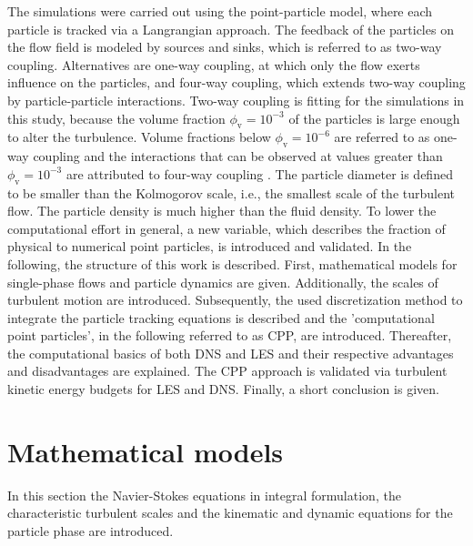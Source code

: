 \documentclass[11pt,a4paper,openany,oneside,parskip=half*]{article}
\begin{document}
\newline
The simulations were carried out using the point-particle model, where each particle is tracked via a Langrangian approach. The feedback of the particles on the flow field is modeled by sources and sinks, which is referred to as two-way coupling. Alternatives are one-way coupling, at which only the flow exerts influence on the particles, and four-way coupling, which extends two-way coupling by particle-particle interactions. Two-way coupling is fitting for the simulations in this study, because the volume fraction $\phi_\mathrm{v}= 10^{-3}$ of the particles is large enough to alter the turbulence. Volume fractions below $\phi_\mathrm{v}= 10^{-6}$ are referred to as one-way coupling and the interactions that can be observed at values greater than $\phi_\mathrm{v}= 10^{-3}$ are attributed to four-way coupling \cite{particleladenTurbulentFlows:DirectSimulationAndClosureModels, OnPredictingParticle-LadenTurbulentFlows}.
The particle diameter is defined to be smaller than the Kolmogorov scale, i.e., the smallest scale of the turbulent flow. The particle density is much higher than the fluid density.
\newline
To lower the computational effort in general, a new variable, which describes the fraction of physical to numerical point particles, is introduced and validated.
\newline
In the following, the structure of this work is described. 
First, mathematical models for single-phase flows and particle dynamics are given. 
Additionally, the scales of turbulent motion are introduced.
Subsequently, the used discretization method to integrate the particle tracking equations is described and the 'computational point particles', in the following referred to as CPP, are introduced.
Thereafter, the computational basics of both DNS and LES and their respective advantages and disadvantages are explained. 
The CPP approach is validated via turbulent kinetic energy budgets for LES and DNS.
Finally, a short conclusion is given.
\pagebreak
\section{Mathematical models}
In this section the Navier-Stokes equations in integral formulation, the characteristic turbulent scales and the kinematic and dynamic equations for the particle phase are introduced.
\newline
\end{document}
